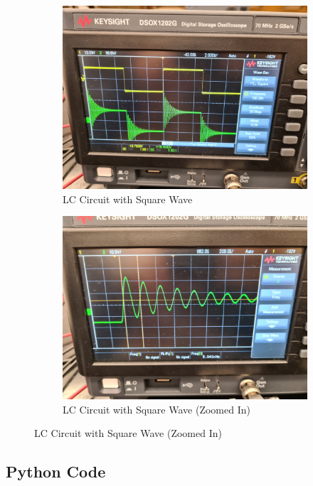 \documentclass[a4paper,12pt]{article}
\begin{document}
\begin{figure}[H]
  \centering
  \begin{subfigure}{.5\textwidth}
    \centering
    \includegraphics[width=.9\linewidth]{../data/20211116_110612.jpg}
    \caption{LC Circuit with Square Wave}
  \end{subfigure}%
  \begin{subfigure}{.5\textwidth}
    \centering
    \includegraphics[width=.9\linewidth]{../data/20211116_110834.jpg}
    \caption{LC Circuit with Square Wave (Zoomed In)}
  \end{subfigure}
\end{figure}

\pagebreak

\subsection{Python Code}
\end{document}
